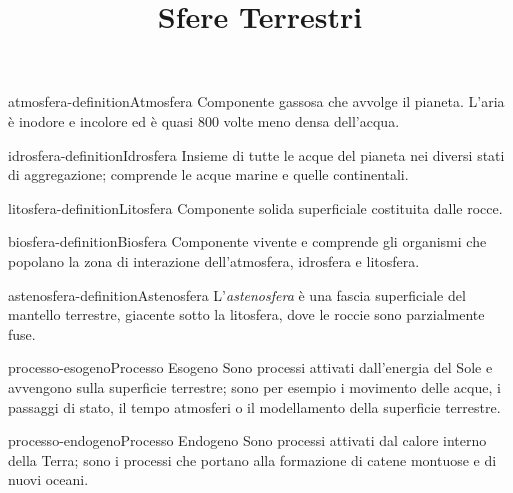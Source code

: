 \documentclass[preview]{standalone}
\begin{document}
\title{Sfere Terrestri}
\genpage


\begin{snippetdefinition}{atmosfera-definition}{Atmosfera}
    Componente gassosa che avvolge il pianeta. L'aria è inodore e incolore ed è quasi 800 volte meno densa dell'acqua.
\end{snippetdefinition}

\begin{snippetdefinition}{idrosfera-definition}{Idrosfera}
    Insieme di tutte le acque del pianeta nei diversi stati di aggregazione; comprende le acque marine e quelle continentali.
\end{snippetdefinition}
    
\begin{snippetdefinition}{litosfera-definition}{Litosfera}
    Componente solida superficiale costituita dalle rocce.
\end{snippetdefinition}

\begin{snippetdefinition}{biosfera-definition}{Biosfera}
    Componente vivente e comprende gli organismi che popolano la zona di interazione dell'atmosfera, idrosfera e litosfera.
\end{snippetdefinition}

\begin{snippetdefinition}{astenosfera-definition}{Astenosfera}
    L'\textit{astenosfera} è una fascia superficiale del mantello terrestre, giacente sotto la litosfera,
    dove le roccie sono parzialmente fuse.
\end{snippetdefinition}

\begin{snippetdefinition}{processo-esogeno}{Processo Esogeno}
    Sono processi attivati dall'energia del Sole e avvengono sulla superficie terrestre; sono per esempio i movimento delle acque, i passaggi di stato, il tempo atmosferi o il modellamento della superficie terrestre.
\end{snippetdefinition}

\begin{snippetdefinition}{processo-endogeno}{Processo Endogeno}
    Sono processi attivati dal calore interno della Terra; sono i processi che portano alla formazione di catene montuose e di nuovi oceani.
\end{snippetdefinition}

\end{document}
